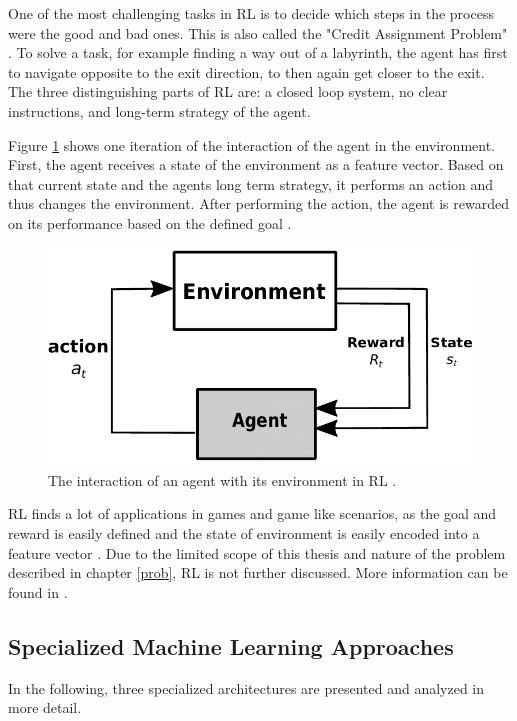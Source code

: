 One of the most challenging tasks in RL is to decide which steps in the process were the good and bad ones. This is also called the "Credit Assignment Problem" \cite{Minsky,Bishop}. To solve a task, for example finding a way out of a labyrinth, the agent has first to navigate opposite to the exit direction, to then again get closer to the exit. The three distinguishing parts of RL are: a closed loop system, no clear instructions, and long-term strategy of the agent. \cite{Sutton}

Figure \ref{fig:SimpleRL} shows one iteration of the interaction of the agent in the environment. First, the agent receives a state of the environment as a feature vector. Based on that current state and the agents long term strategy, it performs an action and thus changes the environment. After performing the action, the agent is rewarded on its performance based on the defined goal \cite{LEX}.

\begin{figure}[H]
	\centering
	\includegraphics[width=0.5\linewidth]{IMGs/SimpleRL.png}
	\caption{The interaction of an agent with its environment in RL \cite{LEX}.}
	\label{fig:SimpleRL}
\end{figure}
RL finds a lot of applications in games and game like scenarios, as the goal and reward is easily defined and the state of environment is easily encoded into a feature vector \cite{Takuma}.
Due to the limited scope of this thesis and nature of the problem described in chapter \ref{prob}, RL is not further discussed. More information can be found in \cite{Sutton}.
 

\subsection{Specialized Machine Learning Approaches}
In the following, three specialized architectures are presented and analyzed in more detail. 
